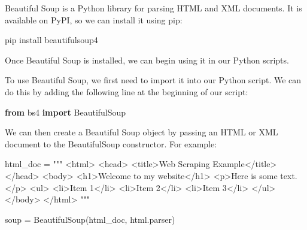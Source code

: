 \documentclass[
  paper=a4,
  ,captions=tableheading
]{scrartcl}
\newenvironment{Shaded}{}{}
\newcommand{\ExtensionTok}[1]{#1}
\newcommand{\ImportTok}[1]{\textcolor[rgb]{0.00,0.50,0.00}{\textbf{#1}}}
\newcommand{\NormalTok}[1]{#1}
\newcommand{\OperatorTok}[1]{\textcolor[rgb]{0.40,0.40,0.40}{#1}}
\newcommand{\StringTok}[1]{\textcolor[rgb]{0.25,0.44,0.63}{#1}}
\begin{document}
Beautiful Soup is a Python library for parsing HTML and XML documents.
It is available on PyPI, so we can install it using pip:

\begin{Shaded}
\begin{Highlighting}[]
\ExtensionTok{pip}\NormalTok{ install beautifulsoup4}
\end{Highlighting}
\end{Shaded}

Once Beautiful Soup is installed, we can begin using it in our Python
scripts.

To use Beautiful Soup, we first need to import it into our Python
script. We can do this by adding the following line at the beginning of
our script:

\begin{Shaded}
\begin{Highlighting}[]
\ImportTok{from}\NormalTok{ bs4 }\ImportTok{import}\NormalTok{ BeautifulSoup}
\end{Highlighting}
\end{Shaded}

We can then create a Beautiful Soup object by passing an HTML or XML
document to the BeautifulSoup constructor. For example:

\begin{Shaded}
\begin{Highlighting}[]
\NormalTok{html\_doc }\OperatorTok{=} \StringTok{"""}
\StringTok{\textless{}html\textgreater{}}
\StringTok{\textless{}head\textgreater{}}
\StringTok{    \textless{}title\textgreater{}Web Scraping Example\textless{}/title\textgreater{}}
\StringTok{\textless{}/head\textgreater{}}
\StringTok{\textless{}body\textgreater{}}
\StringTok{    \textless{}h1\textgreater{}Welcome to my website\textless{}/h1\textgreater{}}
\StringTok{    \textless{}p\textgreater{}Here is some text.\textless{}/p\textgreater{}}
\StringTok{    \textless{}ul\textgreater{}}
\StringTok{        \textless{}li\textgreater{}Item 1\textless{}/li\textgreater{}}
\StringTok{        \textless{}li\textgreater{}Item 2\textless{}/li\textgreater{}}
\StringTok{        \textless{}li\textgreater{}Item 3\textless{}/li\textgreater{}}
\StringTok{    \textless{}/ul\textgreater{}}
\StringTok{\textless{}/body\textgreater{}}
\StringTok{\textless{}/html\textgreater{}}
\StringTok{"""}

\NormalTok{soup }\OperatorTok{=}\NormalTok{ BeautifulSoup(html\_doc, }\StringTok{\textquotesingle{}html.parser\textquotesingle{}}\NormalTok{)}
\end{Highlighting}
\end{Shaded}
\end{document}
